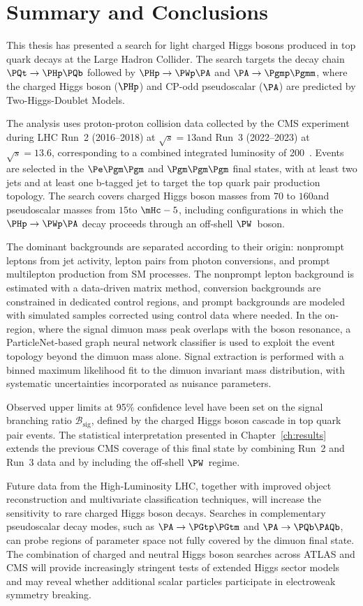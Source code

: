 \chapter{Summary and Conclusions}
\label{ch:conclusion}

This thesis has presented a search for light charged Higgs bosons produced in top quark decays at the Large Hadron Collider. The search targets the decay chain $\PQt \to \PHp\PQb$ followed by $\PHp \to \PWp\PA$ and $\PA \to \Pgmp\Pgmm$, where the charged Higgs boson ($\PHp$) and CP-odd pseudoscalar ($\PA$) are predicted by Two-Higgs-Doublet Models.

The analysis uses proton-proton collision data collected by the CMS experiment during LHC Run~2 (2016--2018) at $\sqrt{s} = 13$\TeV and Run~3 (2022--2023) at $\sqrt{s} = 13.6$\TeV, corresponding to a combined integrated luminosity of 200~\fbinv. Events are selected in the $\Pe\Pgm\Pgm$ and $\Pgm\Pgm\Pgm$ final states, with at least two jets and at least one b-tagged jet to target the top quark pair production topology. The search covers charged Higgs boson masses from $70$ to $160$\GeV and pseudoscalar masses from $15$\GeV to $\mHc - 5$\GeV, including configurations in which the $\PHp \to \PWp\PA$ decay proceeds through an off-shell $\PW$~boson.

The dominant backgrounds are separated according to their origin: nonprompt leptons from jet activity, lepton pairs from photon conversions, and prompt multilepton production from SM processes. The nonprompt lepton background is estimated with a data-driven matrix method, conversion backgrounds are constrained in dedicated control regions, and prompt backgrounds are modeled with simulated samples corrected using control data where needed. In the on-\PZ region, where the signal dimuon mass peak overlaps with the \PZ boson resonance, a ParticleNet-based graph neural network classifier is used to exploit the event topology beyond the dimuon mass alone. Signal extraction is performed with a binned maximum likelihood fit to the dimuon invariant mass distribution, with systematic uncertainties incorporated as nuisance parameters.

Observed upper limits at 95\% confidence level have been set on the signal branching ratio $\mathcal{B}_{\text{sig}}$, defined by the charged Higgs boson cascade in top quark pair events. The statistical interpretation presented in Chapter~\ref{ch:results} extends the previous CMS coverage of this final state by combining Run~2 and Run~3 data and by including the off-shell $\PW$~regime.

Future data from the High-Luminosity LHC, together with improved object reconstruction and multivariate classification techniques, will increase the sensitivity to rare charged Higgs boson decays. Searches in complementary pseudoscalar decay modes, such as $\PA \to \PGtp\PGtm$ and $\PA \to \PQb\PAQb$, can probe regions of parameter space not fully covered by the dimuon final state. The combination of charged and neutral Higgs boson searches across ATLAS and CMS will provide increasingly stringent tests of extended Higgs sector models and may reveal whether additional scalar particles participate in electroweak symmetry breaking.
